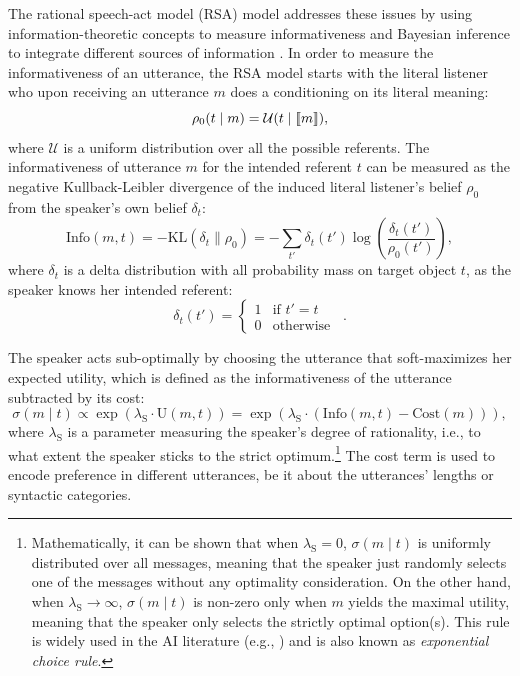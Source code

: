 The rational speech-act model (RSA) model addresses these issues by
using information-theoretic concepts to measure informativeness and
Bayesian inference to integrate different sources of information
\cite{Frank2009,Frank,Bergen2012,GoodmanStuhlmuller2013:Knowledge-and-I}. In
order to measure the informativeness of an utterance, the RSA model
starts with the literal listener who upon receiving an utterance $m$
does a conditioning on its literal meaning:
\begin{equation}\label{Bayesian_literal}
\rho_0(t \mid m) = \mathcal{U}(t\mid \llbracket m \rrbracket) ,
\end{equation}
where $\mathcal{U}$ is a uniform distribution over all the possible
referents. The informativeness of utterance $m$ for the intended
referent $t$ can be measured as the negative Kullback-Leibler
divergence of the induced literal listener's belief $\rho_0$ from the
speaker's own belief $\delta_t$:
\begin{equation} \label{Bayesian_sender_informativeness}
\mbox{Info}(m,t)=-\mbox{KL}(\delta_t \| \rho_0)=-\sum_{t'}\delta_t(t')\log\left(\frac{\delta_t(t')}{\rho_0(t')}\right),
\end{equation}
where $\delta_t$ is a delta distribution with all probability mass on
target object $t$, as the speaker knows her intended referent:
\begin{equation} \label{Bayesian_sender_delta}
\delta_t(t')=\left\{ \begin{array}{ll}
1 & \mbox{if } t' = t \\
0 & \mbox{otherwise}
\end{array}\right. \enspace .
\end{equation}

The speaker acts sub-optimally by choosing the utterance that soft-maximizes her expected utility, which is defined as the informativeness of the utterance subtracted by its cost:
\begin{equation} \label{Bayesian_sender_softmax}
\sigma(m \mid t) \propto \exp(\lambda_\mathrm{S}\cdot \mbox{U}(m,t))=\exp(\lambda_\mathrm{S} \cdot (\mbox{Info}(m,t)-\mbox{Cost}(m))),
\end{equation}
where $\lambda_\mathrm{S}$ is a parameter measuring the speaker's
degree of rationality, i.e., to what extent the speaker sticks to the
strict optimum.\footnote{Mathematically, it can be shown that when $\lambda_\mathrm{S}=0$, $\sigma(m \mid t)$ is uniformly distributed over all messages, meaning that the speaker just randomly selects one of the messages without any optimality consideration. 
On the other hand, when $\lambda_\mathrm{S}\rightarrow \infty$, 
$\sigma(m \mid t)$ is non-zero only when $m$ yields the maximal utility, 
meaning that the speaker only selects the strictly optimal option(s).
This rule is widely used in the AI literature (e.g., \cite{Sutton1998RL}) and 
is also known as \emph{exponential choice rule}.}
The cost term is used to encode preference in
different utterances, be it about the utterances' lengths or syntactic
categories.

